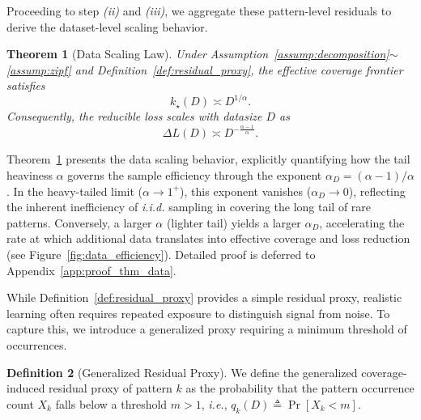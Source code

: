 \documentclass{article}
\theoremstyle{plain}
\newtheorem{theorem}{Theorem}[section]
\theoremstyle{definition}
\newtheorem{definition}[theorem]{Definition}
\theoremstyle{remark}
\begin{document}
Proceeding to step \textit{(ii)} and \textit{(iii)}, we aggregate these pattern-level residuals to derive the dataset-level scaling behavior.
\begin{theorem}[Data Scaling Law]
    \label{thm:data_scaling}
    Under Assumption~\ref{assump:decomposition}$\sim$\ref{assump:zipf} and Definition~\ref{def:residual_proxy}, the effective coverage frontier satisfies
    \begin{equation*}
        k_\star(D) \asymp D^{1/\alpha}.
    \end{equation*}
    Consequently, the reducible loss scales with datasize $D$ as
    \begin{equation*}
        \boxed{
        \Delta L(D) \asymp D^{-\frac{\alpha-1}{\alpha}}.}
        \end{equation*}
\end{theorem}
Theorem~\ref{thm:data_scaling} presents the data scaling behavior, explicitly quantifying how the tail heaviness $\alpha$ governs the sample efficiency through the exponent $\alpha_D = (\alpha-1)/\alpha$.
In the heavy-tailed limit ($\alpha \to 1^+$), this exponent vanishes ($\alpha_D \to 0$), reflecting the inherent inefficiency of \textit{i.i.d.} sampling in covering the long tail of rare patterns. 
Conversely, a larger $\alpha$ (lighter tail) yields a larger $\alpha_D$, accelerating the rate at which additional data translates into effective coverage and loss reduction (see Figure~\ref{fig:data_efficiency}). Detailed proof is deferred to Appendix~\ref{app:proof_thm_data}. 



While Definition~\ref{def:residual_proxy} provides a simple residual proxy, realistic learning often requires repeated exposure to distinguish signal from noise. To capture this, we introduce a generalized proxy requiring a minimum threshold of occurrences.
\begin{definition}[Generalized Residual Proxy]\label{def:m_residual_proxy}
    We define the generalized coverage-induced residual proxy of pattern $k$ as the probability that the pattern occurrence count $X_k$ falls below a threshold $m>1$, \textit{i.e.}, $q_k(D)\triangleq \Pr[X_k<m]$. 
\end{definition}
\end{document}
